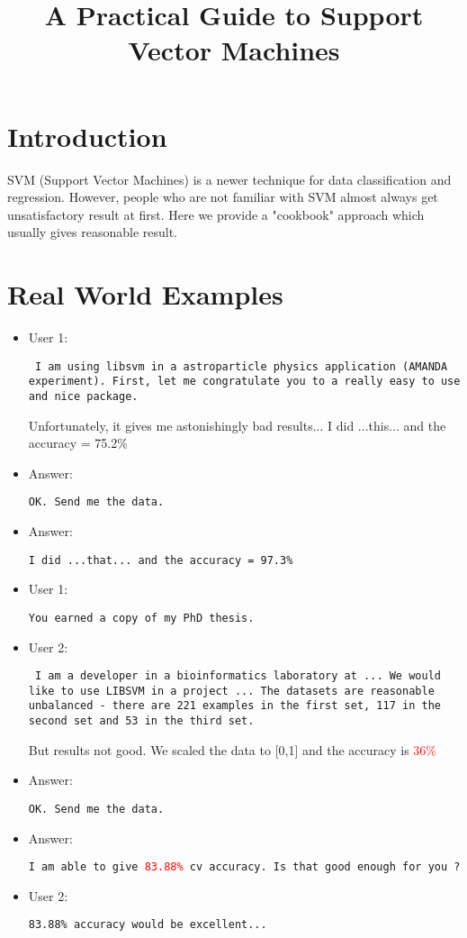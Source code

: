 \documentclass[12pt]{article}
\title{A Practical Guide to Support Vector Machines}
\begin{document}
\section{Introduction}

SVM (Support Vector Machines) is a newer technique for data
classification and regression. However, people who are not 
familiar with SVM almost always get unsatisfactory result 
at first. Here we provide a "cookbook" approach which usually 
gives reasonable result.

\section{Real World Examples}

\begin{itemize}
\item User 1:

{\tt 
I am using libsvm in a astroparticle physics application (AMANDA
experiment). First, let me congratulate you to a really easy to
use and nice package.

Unfortunately, it gives me astonishingly bad results...
I did ...this... and the accuracy = 75.2\%
}

\item Answer:

{\tt OK. Send me the data.}

\item Answer:

{\tt I did ...that... and the accuracy = 97.3\% }

\item User 1:

{\tt You earned a copy of my PhD thesis. }

\item User 2:

{\tt
I am a developer in a bioinformatics laboratory at ...
We would like to use LIBSVM in a project ...
The datasets are reasonable unbalanced - there are 221 examples in the
first set, 117 in the second set and 53 in the third set.

But results not good.
We scaled the data to [0,1] and the accuracy is \textcolor{red}{36\%}
}

\item Answer:

{\tt OK. Send me the data.}

\item Answer:

{\tt I am able to give \textcolor{red}{83.88\%} cv accuracy. 
 Is that good enough for you ? }

\item User 2:

{\tt 83.88\% accuracy would be excellent...}

\end{itemize}
\end{document}
